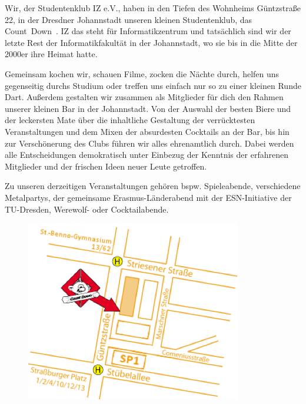 Wir, der Studentenklub IZ e.V., haben in den Tiefen des Wohnheims Güntzstraße 22, in der Dresdner Johannstadt unseren kleinen Studentenklub, das Count~Down~.
IZ das steht für Informatikzentrum und tatsächlich sind wir der letzte Rest der Informatikfakultät in der Johannstadt, wo sie bis in die Mitte der 2000er ihre Heimat hatte.

Gemeinsam kochen wir, schauen Filme, zocken die Nächte durch, helfen uns gegenseitig durchs Studium oder treffen uns einfach nur so zu einer kleinen Runde Dart.
Außerdem gestalten wir zusammen als Mitglieder für dich den Rahmen unserer kleinen Bar in der Johannstadt.
Von der Auswahl der besten Biere und der leckersten Mate über die inhaltliche Gestaltung der verrücktesten Veranstaltungen und dem Mixen der absurdesten Cocktails an der Bar, bis hin zur Verschönerung des Clubs führen wir alles ehrenamtlich durch.
Dabei werden alle Entscheidungen demokratisch unter Einbezug der Kenntnis der erfahrenen Mitglieder und der frischen Ideen neuer Leute getroffen.

Zu unseren derzeitigen Veranstaltungen gehören bspw. Spieleabende, verschiedene Metalpartys, der gemeinsame Erasmus-Länderabend mit der ESN-Initiative der TU-Dresden, Werewolf- oder Cocktailabende.

\begin{figure}%
  \includegraphics[width=\linewidth]{img/cd-anfahrt}
  \vspace{-1cm}
\end{figure}

